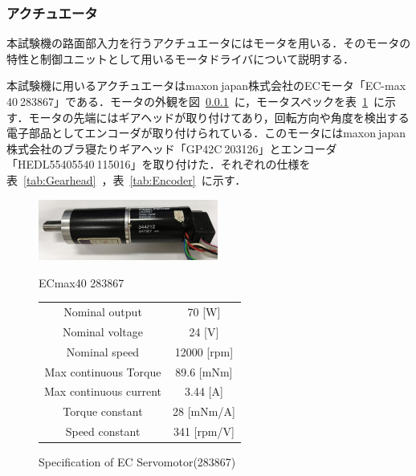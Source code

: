 \documentclass[a4paper,12pt]{article_vdlab_sotsuron}
\begin{document}
\newpage
\subsubsection{アクチュエータ}
本試験機の路面部入力を行うアクチュエータにはモータを用いる．そのモータの特性と制御ユニットとして用いるモータドライバについて説明する．

本試験機に用いるアクチュエータはmaxon$\ $japan株式会社のECモータ「EC-max$\ $40$\ $283867」である．モータの外観を図~\ref{}~に，モータスペックを表~\ref{tab:ecmax40}~に示す．モータの先端にはギアヘッドが取り付けてあり，回転方向や角度を検出する電子部品としてエンコーダが取り付けられている．このモータにはmaxon$\ $japan株式会社のブラ寝たりギアヘッド「GP42C$\ $203126」とエンコーダ「HEDL55405540$\ $115016」を取り付けた．それぞれの仕様を表~\ref{tab:Gearhead}~，表~\ref{tab:Encoder}~に示す．

\vspace*{10mm}
\begin{figure}[htp]
  \begin{minipage}{0.4\textwidth}
    \begin{center}
      \includegraphics[height=20mm]{figure/ecmax40.eps}
      \vspace*{3mm}
      \caption{ECmax40 283867}
      \label{fig:ecmax40}
    \end{center}
  \end{minipage}
  \begin{minipage}{0.6\textwidth}
      \begin{center}
	\makeatletter
	\def\@captype{table}
	\makeatother
	\caption{Specification of EC Servomotor(283867)}
	\label{tab:ecmax40}
	  \begin{tabular}{cc}\hline
	    Nominal output & 70 [W] \\
	    Nominal voltage & 24 [V] \\
	    Nominal speed & 12000 [rpm] \\
	    Max continuous Torque & 89.6 [mNm] \\
	    Max continuous current & 3.44 [A] \\
	    Torque constant & 28 [mNm/A] \\
	    Speed constant & 341 [rpm/V] \\\hline
	  \end{tabular}
	\end{center}
  \end{minipage}
\end{figure}
\end{document}
